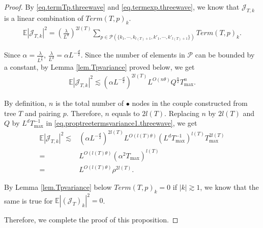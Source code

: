 \begin{proof}
By \eqref{eq.termTp.threewave} and \eqref{eq.termexp.threewave}, we know that $\mathcal{J}_{T,k}$ is a linear combination of $Term(T,p)_k$.
\begin{equation}
\begin{split}
    \mathbb{E}|\mathcal{J}_{T,k}|^2=\left(\frac{\lambda}{L^{d}}\right)^{2l(T)}
    \sum_{p\in \mathcal{P}(\{k_1,\cdots, k_{l(T)+1}, k'_1,\cdots, k'_{l(T)+1}\})} Term(T, p)_k.
\end{split}
\end{equation}

Since $\alpha=\frac{\lambda}{L^{\frac{d}{2}}}$, $\frac{\lambda}{L^{d}}=\alpha L^{-\frac{d}{2}}$. Since the number of elements in $\mathcal{P}$ can be bounded by a constant, by Lemma \ref{lem.Tpvariance} proved below, we get
\begin{equation}\label{eq.proptreetermsvariance1.threewave}
\begin{split}
    \mathbb{E}|\mathcal{J}_{T,k}|^2\lesssim (\alpha L^{-\frac{d}{2}})^{2l(T)}
    L^{O(n\theta)} Q^{\frac{n}{2}}  T^{n}_{\text{max}}  .
\end{split}
\end{equation}

By definition, $n$ is the total number of $\bullet$ nodes in the couple constructed from tree $T$ and pairing $p$. Therefore, $n$ equals to $2l(T)$.  Replacing $n$ by $2l(T)$ and $Q$ by $L^dT^{-1}_{\text{max}}$ in \eqref{eq.proptreetermsvariance1.threewave}, we get
\begin{equation}
\begin{split}
    \mathbb{E}|\mathcal{J}_{T,k}|^2\lesssim& (\alpha L^{-\frac{d}{2}})^{2l(T)}
    L^{O(l(T)\theta)} (L^dT^{-1}_{\text{max}})^{l(T)}  T_{\text{max}}^{2l(T)}  
    \\
    =& L^{O(l(T)\theta)} (\alpha^2 T_{\text{max}})^{l(T)}  
    \\
    =&  L^{O(l(T)\theta)} \rho^{2l(T)}.  
\end{split}
\end{equation}

By Lemma \ref{lem.Tpvariance} below $Term(T,p)_k=0$ if $|k|\gtrsim 1$, we know that the same is true for $\mathbb{E}|(\mathcal{J}_T)_k|^2=0$. 

Therefore, we complete the proof of this proposition.
\end{proof}


